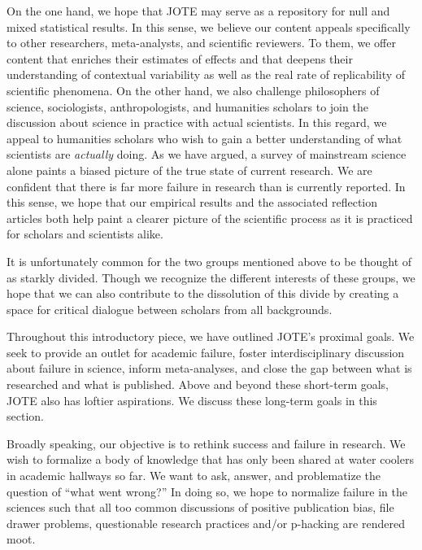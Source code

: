 \documentclass[twocolumn, serif]{jote-article}
\begin{document}
{{{{{{{{{{{{{On the one hand, we hope that JOTE may serve as a repository for null and mixed statistical results. In this sense, we believe our content appeals specifically to other researchers, meta-analysts, and scientific reviewers. To them, we offer content that enriches their estimates of effects and that deepens their understanding of contextual variability as well as the real rate of replicability of scientific phenomena. On the other hand, we also challenge philosophers of science, sociologists, anthropologists, and humanities scholars to join the discussion about science in practice with actual scientists. In this regard, we appeal to humanities scholars who wish to gain a better understanding of what scientists are \emph{actually} doing. As we have argued, a survey of mainstream science alone paints a biased picture of the true state of current research. We are confident that there is far more failure in research than is currently reported. In this sense, we hope that our empirical results and the associated reflection articles both help paint a clearer picture of the scientific process as it is practiced for scholars and scientists alike.

It is unfortunately common for the two groups mentioned above to be thought of as starkly divided. Though we recognize the different interests of these groups, we hope that we can also contribute to the dissolution of this divide by creating a space for critical dialogue between scholars from all backgrounds.

\hypertarget{what-is-our-ultimate-goal}{%

Throughout this introductory piece, we have outlined JOTE's proximal goals. We seek to provide an outlet for academic failure, foster interdisciplinary discussion about failure in science, inform meta-analyses, and close the gap between what is researched and what is published. Above and beyond these short-term goals, JOTE also has loftier aspirations. We discuss these long-term goals in this section.

Broadly speaking, our objective is to rethink success and failure in research. We wish to formalize a body of knowledge that has only been shared at water coolers in academic hallways so far. We want to ask, answer, and problematize the question of ``what went wrong?'' In doing so, we hope to normalize failure in the sciences such that all too common discussions of positive publication bias, file drawer problems, questionable research practices and/or p-hacking are rendered moot.

}}}}}}}}}}}}}}
\end{document}
